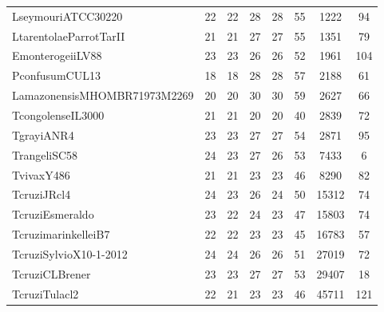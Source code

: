 \documentclass[table,
12pt, %
a4paper, %
oneside, %
headinclude,footinclude, %
BCOR5mm, %
]{scrartcl}
\begin{document}
\begin{table}[htbp]
\begin{adjustbox}{center}
\begin{tabular}{|l|ccccccc|}
      LseymouriATCC30220               & 22  & 22  & 28  & 28  & 55   & 1222  & 94     \\
      LtarentolaeParrotTarII           & 21  & 21  & 27  & 27  & 55   & 1351  & 79     \\
      EmonterogeiiLV88                 & 23  & 23  & 26  & 26  & 52   & 1961  & 104    \\
      PconfusumCUL13                   & 18  & 18  & 28  & 28  & 57   & 2188  & 61     \\
      LamazonensisMHOMBR71973M2269     & 20  & 20  & 30  & 30  & 59   & 2627  & 66     \\
      TcongolenseIL3000                & 21  & 21  & 20  & 20  & 40   & 2839  & 72     \\
      TgrayiANR4                       & 23  & 23  & 27  & 27  & 54   & 2871  & 95     \\
      TrangeliSC58                     & 24  & 23  & 27  & 26  & 53   & 7433  & 6      \\
      TvivaxY486                       & 21  & 21  & 23  & 23  & 46   & 8290  & 82     \\
      TcruziJRcl4                      & 24  & 23  & 26  & 24  & 50   & 15312 & 74     \\
      TcruziEsmeraldo                  & 23  & 22  & 24  & 23  & 47   & 15803 & 74     \\
      TcruzimarinkelleiB7              & 22  & 22  & 23  & 23  & 45   & 16783 & 57     \\
      TcruziSylvioX10-1-2012           & 24  & 24  & 26  & 26  & 51   & 27019 & 72     \\
      TcruziCLBrener                   & 23  & 23  & 27  & 27  & 53   & 29407 & 18     \\
      TcruziTulacl2                    & 22  & 21  & 23  & 23  & 46   & 45711 & 121    \\  \hline\hline
    \end{tabular}
    \label{table:3}
  \end{adjustbox}
\end{table}
\end{document}
